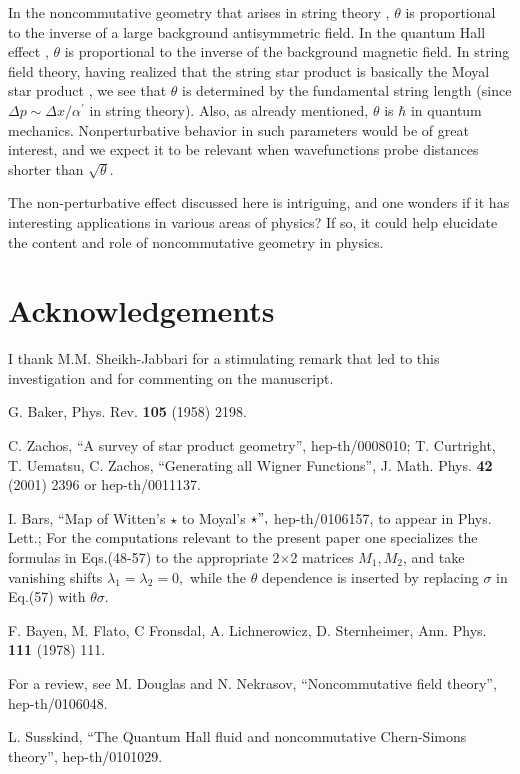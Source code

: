 \documentclass[a4paper,12pt]{article}
\begin{document}
In the noncommutative geometry that arises in string theory \cite{ncstring},
$\theta $ is proportional to the inverse of a large background antisymmetric
field. In the quantum Hall effect \cite{qhe}, $\theta $ is proportional to
the inverse of the background magnetic field. In string field theory, having
realized that the string star product is basically the Moyal star product
\cite{witmoy}, we see that $\theta $ is determined by the fundamental string
length (since $\Delta p\sim \Delta x/\alpha ^{\prime }$ in string theory).
Also, as already mentioned, $\theta $ is $\hbar $ in quantum mechanics.
Nonperturbative behavior in such parameters would be of great interest, and
we expect it to be relevant when wavefunctions probe distances shorter than $%
\sqrt{\theta }$.

The non-perturbative effect discussed here is intriguing, and one wonders if
it has interesting applications in various areas of physics? If so, it could
help elucidate the content and role of noncommutative geometry in physics.

\section{Acknowledgements}

I thank M.M. Sheikh-Jabbari for a stimulating remark that led to this
investigation and for commenting on the manuscript.

\begin{thebibliography}{9}
  G. Baker, Phys. Rev. \textbf{105} (1958) 2198.

  C. Zachos, ``A survey of star product geometry'',
hep-th/0008010; T. Curtright, T. Uematsu, C. Zachos, ``Generating all Wigner
Functions'', J. Math. Phys. \textbf{42} (2001) 2396 or hep-th/0011137.

  I. Bars, ``Map of Witten's $\star $ to Moyal's $\star ",$
hep-th/0106157, to appear in Phys. Lett.; For the computations relevant to
the present paper one specializes the formulas in Eqs.(48-57) to the
appropriate 2$\times $2 matrices $M_{1},M_{2}$, and take vanishing shifts $%
\lambda _{1}=\lambda _{2}=0,$ while the $\theta $ dependence is inserted by
replacing $\sigma $ in Eq.(57) with $\theta \sigma .$

  F. Bayen, M. Flato, C Fronsdal, A. Lichnerowicz, D.
Sternheimer, Ann. Phys. \textbf{111 }(1978) 111.

  For a review, see M. Douglas and N. Nekrasov,
``Noncommutative field theory'', hep-th/0106048.

  L. Susskind, ``The Quantum Hall fluid and noncommutative
Chern-Simons theory'', hep-th/0101029.
\end{thebibliography}

\bigskip
\end{document}
